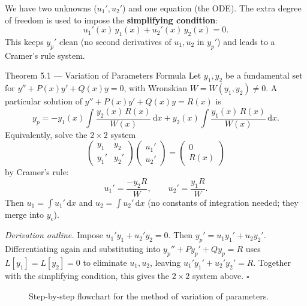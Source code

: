 \documentclass[12pt,a4paper]{article}
\newcommand{\R}{\mathbb{R}}
\newcommand{\dd}{\mathrm{d}}
\begin{document}
We have two unknowns ($u_1', u_2'$) and one equation (the ODE). The extra
degree of freedom is used to impose the \textbf{simplifying condition}:
\[
  u_1'(x)\,y_1(x) + u_2'(x)\,y_2(x) = 0.
\]
This keeps $y_p'$ clean (no second derivatives of $u_1, u_2$ in $y_p'$) and
leads to a Cramer's rule system.

\begin{theorembox}{Theorem 5.1 --- Variation of Parameters Formula}
Let $y_1, y_2$ be a fundamental set for $y'' + P(x)y' + Q(x)y = 0$, with Wronskian
$W = W(y_1,y_2) \neq 0$. A particular solution of $y'' + P(x)y' + Q(x)y = R(x)$
is
\[
  y_p = -y_1(x)\int\frac{y_2(x)\,R(x)}{W(x)}\,\dd x
        + y_2(x)\int\frac{y_1(x)\,R(x)}{W(x)}\,\dd x.
\]
Equivalently, solve the $2\times 2$ system
\[
  \begin{pmatrix}y_1 & y_2\\y_1' & y_2'\end{pmatrix}
  \begin{pmatrix}u_1'\\u_2'\end{pmatrix}
  =
  \begin{pmatrix}0\\R(x)\end{pmatrix}
\]
by Cramer's rule:
\[
  u_1' = \frac{-y_2 R}{W}, \qquad u_2' = \frac{y_1 R}{W}.
\]
Then $u_1 = \int u_1'\,\dd x$ and $u_2 = \int u_2'\,\dd x$ (no constants of
integration needed; they merge into $y_c$).
\end{theorembox}

\textit{Derivation outline.} Impose $u_1'y_1 + u_2'y_2 = 0$. Then
$y_p' = u_1 y_1' + u_2 y_2'$. Differentiating again and substituting into
$y_p'' + Py_p' + Qy_p = R$ uses $L[y_1] = L[y_2] = 0$ to eliminate
$u_1, u_2$, leaving $u_1'y_1' + u_2'y_2' = R$. Together with the simplifying
condition, this gives the $2\times 2$ system above. $\square$

\begin{figure}[H]
\centering
{}
\caption{Step-by-step flowchart for the method of variation of parameters.}
\label{fig:vop}
\end{figure}
\end{document}
